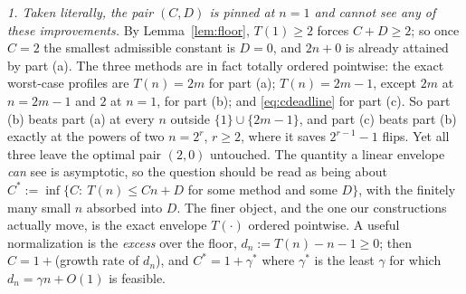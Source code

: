 \documentclass[11pt]{article}
\theoremstyle{remark}
\begin{document}
\emph{1. Taken literally, the pair $(C,D)$ is pinned at $n=1$ and cannot see
any of these improvements.} By Lemma~\ref{lem:floor}, $T(1)\ge2$ forces
$C+D\ge2$; so once $C=2$ the smallest admissible constant is $D=0$, and
$2n+0$ is already attained by part (a). The three methods are in fact totally
ordered pointwise: the exact worst-case profiles are $T(n)=2m$ for part (a);
$T(n)=2m-1$, except $2m$ at $n=2m-1$ and $2$ at $n=1$, for part (b); and
\eqref{eq:cdeadline} for part (c). So part (b) beats part (a) at every $n$
outside $\{1\}\cup\{2m-1\}$, and part (c) beats part (b) exactly at the powers
of two $n=2^r$, $r\ge2$, where it saves $2^{r-1}-1$ flips. Yet all three leave
the optimal pair $(2,0)$ untouched. The quantity a linear envelope \emph{can} see is
asymptotic, so the question should be read as being about
$C^{*}:=\inf\{C:\ T(n)\le Cn+D$ for some method and some $D\}$, with the
finitely many small $n$ absorbed into $D$. The finer object, and the one our
constructions actually move, is the exact envelope $T(\cdot)$ ordered
pointwise. A useful normalization is the \emph{excess} over the floor,
$d_n:=T(n)-n-1\ge0$; then $C=1+{}$(growth rate of $d_n$), and
$C^{*}=1+\gamma^{*}$ where $\gamma^{*}$ is the least $\gamma$ for which
$d_n=\gamma n+O(1)$ is feasible.
\end{document}
